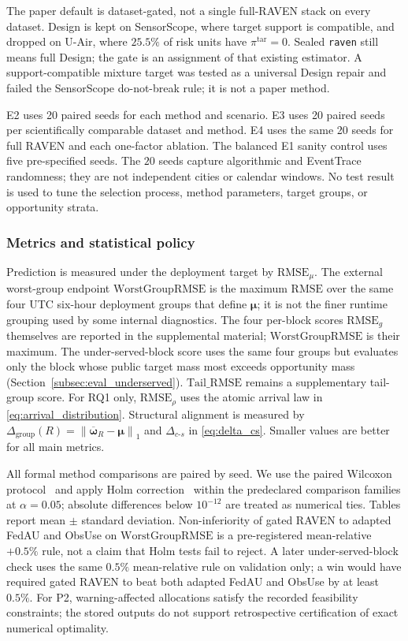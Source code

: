 \documentclass[letterpaper,journal]{IEEEtran}
\begin{document}
The paper default is dataset-gated, not a single full-RAVEN stack on
every dataset.  Design is kept on SensorScope, where target support is
compatible, and dropped on U-Air, where $25.5\%$ of risk units have
$\pi^{\mathrm{tar}}=0$.  Sealed \texttt{raven} still means full Design;
the gate is an assignment of that existing estimator.  A
support-compatible mixture target was tested as a universal Design
repair and failed the SensorScope do-not-break rule; it is not a paper
method.

E2 uses 20 paired seeds for each method and scenario.  E3 uses 20 paired seeds
per scientifically comparable dataset and method.  E4 uses the same 20 seeds
for full RAVEN and each one-factor ablation.  The balanced E1 sanity control
uses five pre-specified seeds.  The $20$ seeds capture algorithmic and
EventTrace randomness; they are not independent cities or calendar windows.
No test result is used to tune the selection process,
method parameters, target groups, or opportunity strata.

\subsubsection{Metrics and statistical policy}

Prediction is measured under the deployment target by
$\mathrm{RMSE}_{\mu}$.  The external worst-group endpoint
$\mathrm{WorstGroupRMSE}$ is the maximum $\mathrm{RMSE}$ over the same
four UTC six-hour deployment groups that define $\boldsymbol\mu$; it is
not the finer runtime grouping used by some internal diagnostics.
The four per-block scores $\mathrm{RMSE}_g$ themselves are reported in
the supplemental material; $\mathrm{WorstGroupRMSE}$ is their maximum.
The under-served-block score uses the same four groups but evaluates
only the block whose public target mass most exceeds opportunity mass
(Section~\ref{subsec:eval_underserved}).
$\mathrm{Tail\_RMSE}$ remains a supplementary tail-group score.
For RQ1 only, $\mathrm{RMSE}_{\rho}$ uses
the atomic arrival law in \eqref{eq:arrival_distribution}.  Structural
alignment is measured by
$\Delta_{\mathrm{group}}(R)=\left\|\overline{\boldsymbol\omega}_R-\boldsymbol\mu\right\|_1$
and $\Delta_{c\text{-}s}$ in \eqref{eq:delta_cs}.  Smaller values are
better for all main metrics.

All formal method comparisons are paired by seed.  We use the paired
Wilcoxon protocol~\cite{wilcoxon1945individual} and apply Holm
correction~\cite{holm1979simple} within the predeclared comparison
families at $\alpha=0.05$; absolute differences below
$10^{-12}$ are treated as numerical ties.  Tables report
mean $\pm$ standard deviation.  Non-inferiority of gated RAVEN to
adapted FedAU and ObsUse on $\mathrm{WorstGroupRMSE}$ is a
pre-registered mean-relative $+0.5\%$ rule, not a claim that Holm
tests fail to reject.  A later under-served-block check uses the same
$0.5\%$ mean-relative rule on validation only; a win would have required
gated RAVEN to beat both adapted FedAU and ObsUse by at least $0.5\%$.
For P2, warning-affected allocations satisfy
the recorded feasibility constraints; the stored outputs do not
support retrospective certification of exact numerical optimality.
\end{document}
